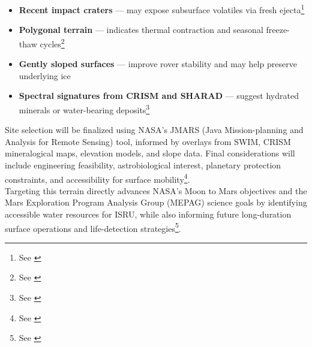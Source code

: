 \begin{itemize}
    \item \textbf{Recent impact craters} — may expose subsurface volatiles via fresh ejecta\footnote{See \cite{bramson_2015_excess}}
    \item \textbf{Polygonal terrain} — indicates thermal contraction and seasonal freeze-thaw cycles\footnote{See \cite{mellon_1995_ground_ice}}
    \item \textbf{Gently sloped surfaces} — improve rover stability and may help preserve underlying ice
    \item \textbf{Spectral signatures from CRISM and SHARAD} — suggest hydrated minerals or water-bearing deposits\footnote{See \cite{plaut_2007_subsurface, putzig_2012_stratigraphy, nasa_sharad_data}}
\end{itemize}

Site selection will be finalized using NASA’s JMARS (Java Mission-planning and Analysis for Remote Sensing) tool, informed by overlays from SWIM, CRISM mineralogical maps, elevation models, and slope data. Final considerations will include engineering feasibility, astrobiological interest, planetary protection constraints, and accessibility for surface mobility\footnote{See \cite{head_2010_glaciation}}.\\

Targeting this terrain directly advances NASA’s Moon to Mars objectives and the Mars Exploration Program Analysis Group (MEPAG) science goals by identifying accessible water resources for ISRU, while also informing future long-duration surface operations and life-detection strategies\footnote{See \cite{nrc_2022_decadal}}.
